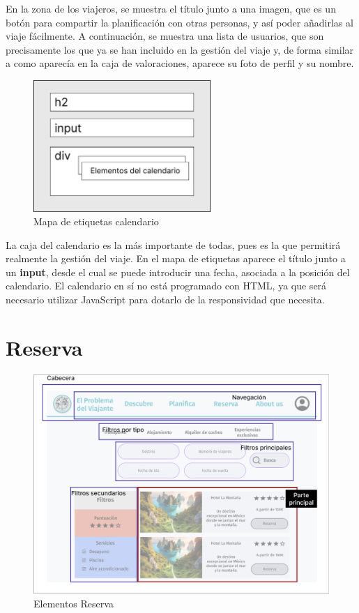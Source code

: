 \documentclass[11pt, a4paper]{book}
\begin{document}
	En la zona de los viajeros, se muestra el título junto a una imagen, que es un botón para compartir la planificación con otras personas, y así poder añadirlas al viaje fácilmente. A continuación, se muestra una lista de usuarios, que son precisamente los que ya se han incluido en la gestión del viaje y, de forma similar a como aparecía en la caja de valoraciones, aparece su foto de perfil y su nombre.

	\begin{figure} [H]
		\centering
		\includegraphics[width=0.6\textwidth]{HTML/Etiq-calendario.jpg}
		\caption{Mapa de etiquetas calendario}
	\end{figure}

	La caja del calendario es la más importante de todas, pues es la que permitirá realmente la gestión del viaje. En el mapa de etiquetas aparece el título junto a un \textbf{input}, desde el cual se puede introducir una fecha, asociada a la posición del calendario. El calendario en sí no está programado con HTML, ya que será necesario utilizar JavaScript para dotarlo de la responsividad que necesita.
	
	\newpage

    \section{Reserva}

	\begin{figure} [H]
		\centering
		\includegraphics[width=\textwidth]{HTML/Doc-reserva.jpg}
		\caption{Elementos Reserva}
	\end{figure}
\end{document}
